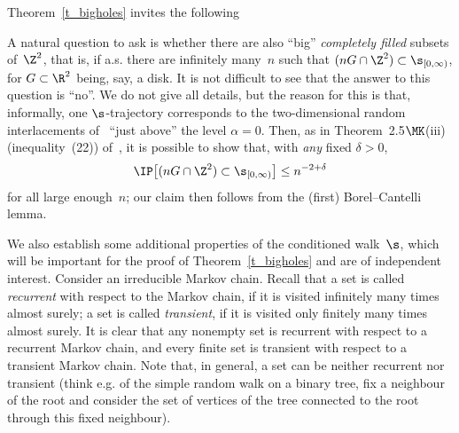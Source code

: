 Theorem~\ref{t_bigholes} invites the following

\begin{rema}\label{rem_filled}
A natural question to ask is whether there are also ``big'' \emph{completely filled} subsets of~$\Z^2$, that is, if a.s. there are infinitely many~$n$ such that $(nG\cap \Z^2)\subset \s_{[0,\infty)}$, for $G\subset\R^2$ being, say, a disk. It is not difficult to see that the answer to this question is ``no''. We do not give all details, but the reason for this is that, informally, one $\s$-trajectory corresponds to the two-dimensional random interlacements of~\cite{CPV16} ``just above'' the level $\alpha=0$. Then, as in Theorem~2.5$\MK$(iii) (inequality~(22)) of~\cite{CPV16}, it is possible to show that, with \emph{any} fixed $\delta>0$,
\[
\IP\big[(nG\cap \Z^2)\subset \s_{[0,\infty)}\big]
\leq n^{-2+\delta}
\]
for all large enough~$n$; our claim then follows from the (first) Borel--Cantelli lemma.
\end{rema}

We also establish some additional properties of the conditioned walk~$\s$, which will be important for the proof of Theorem~\ref{t_bigholes} and are of independent interest. Consider an irreducible Markov chain. Recall that a set is called \emph{recurrent} with respect to the Markov chain, if it is visited infinitely many times almost surely; a set is called \emph{transient}, if it is visited only finitely many times almost surely. It is clear that any nonempty set is recurrent with respect to a recurrent Markov chain, and every finite set is transient with respect to a transient Markov chain. Note that, in general, a set can be neither recurrent nor transient (think e.g. of the simple random walk on a binary tree, fix a neighbour of the root and consider the set of vertices of the tree connected to the root through this fixed neighbour).

